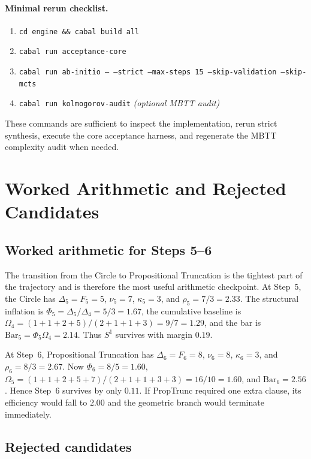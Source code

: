 \documentclass[11pt,a4paper]{article}
\theoremstyle{plain}
\theoremstyle{definition}
\theoremstyle{remark}
\begin{document}
\paragraph{Minimal rerun checklist.}
\begin{enumerate}[nosep]
    \item \texttt{cd engine \&\& cabal build all}
    \item \texttt{cabal run acceptance-core}
    \item \texttt{cabal run ab-initio -- --strict --max-steps 15 --skip-validation --skip-mcts}
    \item \texttt{cabal run kolmogorov-audit} \textit{(optional MBTT audit)}
\end{enumerate}
These commands are sufficient to inspect the implementation, rerun strict synthesis, execute the core acceptance harness, and regenerate the MBTT complexity audit when needed.

\section{Worked Arithmetic and Rejected Candidates}
\label{app:rejections}

\subsection{Worked arithmetic for Steps 5--6}
\label{app:worked-arithmetic}

The transition from the Circle to Propositional Truncation is the tightest part of the trajectory and is therefore the most useful arithmetic checkpoint.
At Step~5, the Circle has $\Delta_5=F_5=5$, $\nu_5=7$, $\kappa_5=3$, and $\rho_5=7/3=2.33$.
The structural inflation is $\Phi_5=\Delta_5/\Delta_4=5/3=1.67$, the cumulative baseline is $\Omega_4=(1+1+2+5)/(2+1+1+3)=9/7=1.29$, and the bar is $\mathrm{Bar}_5=\Phi_5\Omega_4=2.14$.
Thus $S^1$ survives with margin $0.19$.

At Step~6, Propositional Truncation has $\Delta_6=F_6=8$, $\nu_6=8$, $\kappa_6=3$, and $\rho_6=8/3=2.67$.
Now $\Phi_6=8/5=1.60$, $\Omega_5=(1+1+2+5+7)/(2+1+1+3+3)=16/10=1.60$, and $\mathrm{Bar}_6=2.56$.
Hence Step~6 survives by only $0.11$.
If PropTrunc required one extra clause, its efficiency would fall to $2.00$ and the geometric branch would terminate immediately.

\subsection{Rejected candidates}
\end{document}
